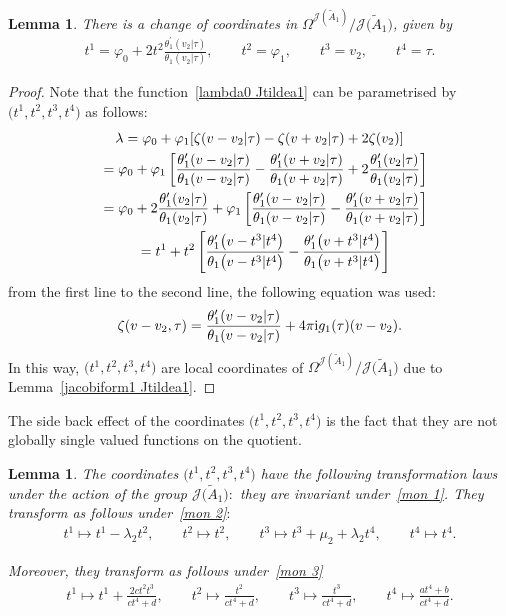 \documentclass[pdftex]{sigma}%
\numberwithin{equation}{section}
\newtheorem{Lemma}[Theorem]{Lemma}
\newcommand{\Ja}{\mathcal{J}}
\begin{document}
\begin{Lemma}
There is a change of coordinates in $\Omega^{\Ja(\tilde A_1)}/\Ja\big(\tilde A_1\big)$, given by
\begin{gather*}
t^1=\varphi_0+2t^2\frac{\theta_1^{\prime}(v_2|\tau)}{\theta_1(v_2|\tau)},\qquad
t^2=\varphi_1,\qquad
t^3=v_2,\qquad
t^4=\tau.
\end{gather*}
\end{Lemma}
\begin{proof}
Note that the function~\eqref{lambda0 Jtildea1} can be parametrised by $\big(t^1,t^2,t^3,t^4\big)$ as follows:
\begin{gather*}
\lambda=\varphi_0+\varphi_1[\zeta(v-v_2|\tau)-\zeta(v+v_2|\tau)+2\zeta(v_2)]
\\ \hphantom{\lambda}
{}=\varphi_0+\varphi_1\left[\frac{\theta_1^{\prime}(v-v_2|\tau)}{\theta_1(v-v_2|\tau)} -\frac{\theta_1^{\prime}(v+v_2|\tau)}{\theta_1(v+v_2|\tau)} +2\frac{\theta_1^{\prime}(v_2|\tau)}{\theta_1(v_2|\tau)}\right]
\\ \hphantom{\lambda}
{}=\varphi_0+2\frac{\theta_1^{\prime}(v_2|\tau)}{\theta_1(v_2|\tau)} +\varphi_1\left[\frac{\theta_1^{\prime}(v-v_2|\tau)}{\theta_1(v-v_2|\tau)} -\frac{\theta_1^{\prime}(v+v_2|\tau)}{\theta_1(v+v_2|\tau)}\right]
\\ \hphantom{\lambda}
{}=t^1+t^2\left[\frac{\theta_1^{\prime}\big(v-t^3|t^4\big)}{\theta_1\big(v-t^3|t^4\big)} -\frac{\theta_1^{\prime}\big(v+t^3|t^4\big)}{\theta_1\big(v+t^3|t^4\big)}\right]
\end{gather*}
from the first line to the second line, the following equation was used:
\begin{gather*}
\zeta(v-v_2,\tau)=\frac{\theta_1^{\prime}(v-v_2|\tau)}{\theta_1(v-v_2|\tau)}+4\pi {\rm i}g_1(\tau)(v-v_2).
\end{gather*}
 In this way, $\big(t^1,t^2,t^3,t^4\big)$ are local coordinates of $\Omega^{\Ja(\tilde A_1)}/\Ja\big(\tilde A_1\big)$ due to Lemma~\ref{jacobiform1 Jtildea1}.
\end{proof}

The side back effect of the coordinates $\big(t^1,t^2,t^3,t^4\big)$ is the fact that they are not globally single valued functions on the quotient.

\begin{Lemma}%
The coordinates $\big(t^1,t^2,t^3,t^4\big)$ have the following transformation laws under the action of the group $\Ja\big(\tilde A_1\big){:}$ they are invariant under~\eqref{mon 1}.
They transform as follows under~\eqref{mon 2}$:$
\begin{gather*}
t^1\mapsto t^1-\lambda_2t^2,\qquad
t^2\mapsto t^2,\qquad
t^3\mapsto t^3+\mu_2+\lambda_2t^4,\qquad
t^4\mapsto t^4.
\end{gather*}

Moreover, they transform as follows under~\eqref{mon 3}
\begin{gather*}
t^1\mapsto t^1+\frac{2ct^2t^3}{ct^4+d},\qquad
t^2\mapsto \frac{t^2}{ct^4+d},\qquad
t^3\mapsto \frac{t^3}{ct^4+d},\qquad
t^4\mapsto \frac{at^4+b}{ct^4+d}.
\end{gather*}
\end{Lemma}
\end{document}
